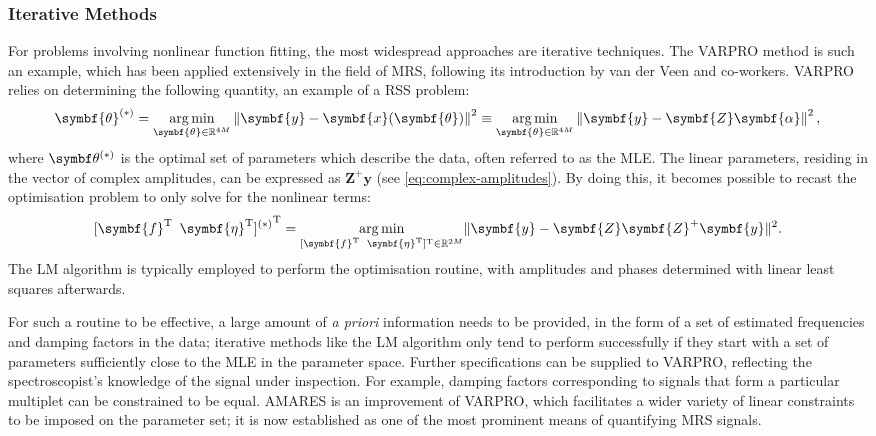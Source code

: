 \subsubsection{Iterative Methods}
For problems involving nonlinear function fitting, the most widespread approaches
are iterative techniques. The \ac{VARPRO} method\cite{Golub1973} is such an
example, which has been applied extensively in the field of \ac{MRS}, following
its introduction by van der Veen and
co-workers\cite{VanDerVeen1988,Decannierec1994}. \ac{VARPRO}
relies on determining the following quantity, an example of a \ac{RSS} problem:
\begin{equation}
    \symbf{\theta}^{(*)} = \argmin_{\symbf{\theta} \in \mathbb{R}^{4M}}
        \left \lVert \symbf{y} - \symbf{x}(\symbf{\theta}) \right \rVert^2 \equiv
        \argmin_{\symbf{\theta} \in \mathbb{R}^{4M}} \left \lVert \symbf{y} - \symbf{Z}\symbf{\alpha} \right \rVert^2,
\end{equation}
where $\bthstar$ is the optimal set of parameters which describe the data,
often referred to as the \ac{MLE}.
The linear parameters, residing in the vector of complex amplitudes, can be
expressed as $\symbf{Z}^+\symbf{y}$ (see \cref{eq:complex-amplitudes}). By doing
this, it becomes possible to recast the optimisation problem to only solve for
the nonlinear terms:
\begin{equation}
    {[\symbf{f}\T \hspace*{5pt} \symbf{\eta}\T]^{(*)}}\T =
        \argmin_{[\symbf{f}\T \hspace*{5pt} \symbf{\eta}\T]\T \in \mathbb{R}^{2M}}
        \lVert \symbf{y} - \symbf{Z}\symbf{Z}^+\symbf{y} \rVert^2.
\end{equation}
The \ac{LM} algorithm\cite{Levenberg1944, Marquardt1963} is
typically employed to perform the optimisation routine, with amplitudes and
phases determined with linear least squares afterwards.

For such a routine to be effective, a large amount of \textit{a priori}
information needs to be provided, in the form of a set of estimated frequencies
and damping factors in the data; iterative methods like the \ac{LM} algorithm
only tend to perform successfully if they start with a set of parameters
sufficiently close to the \ac{MLE} in the parameter space.
Further specifications can be supplied to \ac{VARPRO}, reflecting the
spectroscopist's knowledge of the signal under inspection. For example, damping
factors corresponding to signals that form a particular multiplet can be
constrained to be equal. \Ac{AMARES} is an improvement of \ac{VARPRO}, which
facilitates a wider variety of linear constraints to be imposed on the
parameter set\cite{Vanhamme1997}; it is now established as one of the most
prominent means of quantifying \ac{MRS} signals.

